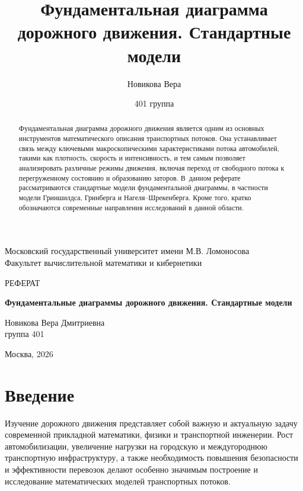 \documentclass[12pt,a4paper]{article}
\title{\textbf{Фундаментальная диаграмма дорожного движения. Стандартные модели}}
\author{Новикова Вера}
\date{401 группа}
\begin{document}
\begin{titlepage}
    \begin{center}
        {\large Московский государственный университет имени М.В. Ломоносова} \\
        {\large Факультет вычислительной математики и кибернетики}

        \vspace{5cm}

        {\Large РЕФЕРАТ}

        \vspace{0.5cm}

        {\LARGE \bfseries Фундаментальные диаграммы дорожного движения. Стандартные модели}

        \vspace{2.5cm}

        {\large Новикова Вера Дмитриевна} \\
        {\large группа 401}

        \vfill

        {\large Москва, 2026}
    \end{center}
\end{titlepage}

\newpage
\setcounter{page}{1} %

\begin{abstract}
Фундаментальная диаграмма дорожного движения является одним из основных инструментов математического описания транспортных потоков. Она устанавливает связь между ключевыми макроскопическими характеристиками потока автомобилей, такими как плотность, скорость и интенсивность, и тем самым позволяет анализировать различные режимы движения, включая переход от свободного потока к перегруженному состоянию и образованию заторов. В~данном реферате рассматриваются стандартные модели фундаментальной диаграммы, в частности модели Гриншилдса, Гринберга и Нагеля--Шрекенберга. Кроме того, кратко обозначаются современные направления исследований в данной области.
\end{abstract}


\section{Введение}

Изучение дорожного движения представляет собой важную и актуальную задачу современной прикладной математики, физики и транспортной инженерии. Рост автомобилизации, увеличение нагрузки на городскую и междугороднюю транспортную инфраструктуру, а также необходимость повышения безопасности и эффективности перевозок делают особенно значимым построение и исследование математических моделей транспортных потоков.
\end{document}
